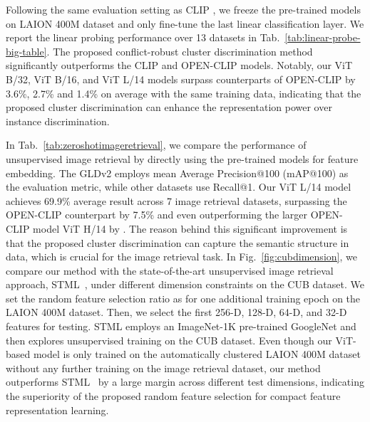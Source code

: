 \documentclass{article} \usepackage{iclr2023_conference,times}
\def\laion{LAION 400M dataset}
\begin{document}
 Following the same evaluation setting as CLIP \citep{radford2021learning}, we freeze the pre-trained models on \laion{} and only fine-tune the last linear classification layer. 
We report the linear probing performance over 13 datasets in Tab.~\ref{tab:linear-probe-big-table}. 
The proposed conflict-robust cluster discrimination method significantly outperforms the CLIP and OPEN-CLIP \citep{openclip} models. 
Notably, our ViT B/32, ViT B/16, and ViT L/14 models surpass counterparts of OPEN-CLIP by 3.6\%, 2.7\% and 1.4\% on average with the same training data, indicating that the proposed cluster discrimination can enhance the representation power over instance discrimination.

In Tab.~\ref{tab:zeroshotimageretrieval}, we compare the performance of unsupervised image retrieval by directly using the pre-trained models for feature embedding. The GLDv2 \citep{weyand2020google} employs mean Average Precision@100 (mAP@100) as the evaluation metric, while other datasets use Recall@1.
Our ViT L/14 model achieves 69.9\% average result across 7 image retrieval datasets, surpassing the OPEN-CLIP counterpart by 7.5\% and even outperforming the larger OPEN-CLIP model ViT H/14 by . 
The reason behind this significant improvement is that the proposed cluster discrimination can capture the semantic structure in data, which is crucial for the image retrieval task. 
In Fig.~\ref{fig:cubdimension}, we compare our method with the state-of-the-art unsupervised image retrieval approach, STML~\citep{Kim2022CVPR}, under different dimension constraints on the CUB dataset. We set the random feature selection ratio  as  for one additional training epoch on the \laion{}. Then, we select the first 256-D, 128-D, 64-D, and 32-D features for testing. STML employs an ImageNet-1K pre-trained GoogleNet \citep{szegedy2015going} and then explores unsupervised training on the CUB dataset. Even though our ViT-based model is only trained on the automatically clustered \laion{} without any further training on the image retrieval dataset, our method outperforms STML~\citep{Kim2022CVPR} by a large margin across different test dimensions, indicating the superiority of the proposed random feature selection for compact feature representation learning.
\end{document}
